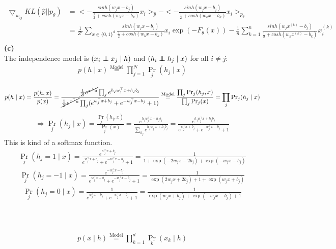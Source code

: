 \documentclass[a4paper]{article}
\newcommand\indep{\protect\mathpalette{\protect\indeP}{\perp}}
\def\indeP#1#2{\mathrel{\rlap{$#1#2$}\mkern2mu{#1#2}}}
\newcommand{\1}{\mathds{1}}
\begin{document}
\begin{align*}
\bigtriangledown_{w_{ij}}KL(\hat{p}||p_{\theta})&=<-\frac{sinh(w_jx-b_j)}{\frac{1}{2}+cosh(w_kx-b_k)}x_i>_{\hat{p}}-<-\frac{sinh(w_jx-b_j)}{\frac{1}{2}+cosh(w_kx-b_k)}x_i>_{p_{\theta}}\\
&=\frac{1}{Z'}\sum_{x\in\{0,1\}^d}\frac{sinh(w_jx-b_j)}{\frac{1}{2}+cosh(w_kx-b_k)}x_i\exp(-F_{\theta}(x))-\frac{1}{n}\sum_{k=1}^{n}\frac{sinh(w_jx^{(k)}-b_j)}{\frac{1}{2}+cosh(w_kx^{(k)}-b_k)}x^{(k)}_i\\
\end{align*}
\textbf{(c)} \\
The independence model is $(x_i \indep x_j \mid h)$ and $(h_i \indep h_j \mid x)$ for all $i\neq j$:   
\begin{gather*}
p(h \mid x) \stackrel{\text{Model}}{=} \prod_{j=1}^N {\Pr}_j(h_j \mid x)  
\end{gather*}

\begin{gather*}
p(h \mid x) = {p(h, x) \over p(x)} 
= 
\frac{\cancel{{1\over Z} e^{x^\top a}}\prod_j e^{h_jw_j^\top x + h_j b_j} }
{\cancel{{1\over Z} e^{x^\top a}}\prod_j (e^{w_j^\top x + b_j} + e^{-w_j^\top x - b_j} + 1)}
\stackrel{\text{Model}}{=}
\frac{\prod_j {\Pr}_j(h_j, x)}{\prod_j {\Pr}_j(x)}
=
\prod_j {\Pr}_j(h_j \mid x)
\end{gather*}
\begin{gather*}
\Longrightarrow
{\Pr}_j(h_j \mid x)
=
\frac{{\Pr}_j(h_j, x)}{{\Pr}_j(x)}
=
\frac{e^{h_jw^\top_jx + h_jb_j}} {\sum_{h_j} e^{h_jw^\top_jx + h_jb_j}}
=
\frac{e^{h_jw_j^\top x + h_j b_j} }
{e^{w_j^\top x + b_j} + e^{-w_j^\top x - b_j} + 1}
\end{gather*}
This is kind of a softmax function.
\begin{gather*}
{\Pr}_j(h_j = 1 \mid x)  
= 
\frac{e^{w_j^\top x + b_j} }
{e^{w_j^\top x + b_j} + e^{-w_j^\top x - b_j} + 1}
=
\frac{1}{1 + \exp(-2w_jx - 2b_j) + \exp(-w_jx - b_j)} 
\end{gather*}
\begin{gather*}
{\Pr}_j(h_j = -1 \mid x) 
= 
\frac{e^{-w_j^\top x - b_j} }
{e^{w_j^\top x + b_j} + e^{-w_j^\top x - b_j} + 1}
=
\frac{1}{\exp(2w_jx + 2b_j) + 1 + \exp(w_jx + b_j)} 
\end{gather*}
\begin{gather*}
{\Pr}_j(h_j = 0 \mid x)  
= 
\frac{1 }
{e^{w_j^\top x + b_j} + e^{-w_j^\top x - b_j} + 1}
=
\frac{1}{\exp(w_jx + b_j) +  \exp(-w_jx - b_j) + 1 }
\end{gather*}
\\
\\
\\
\begin{gather*}
p(x \mid h) \stackrel{\text{Model}}{=} \prod_{k=1}^d {\Pr}_k(x_k \mid h)  
\end{gather*}
\end{document}
